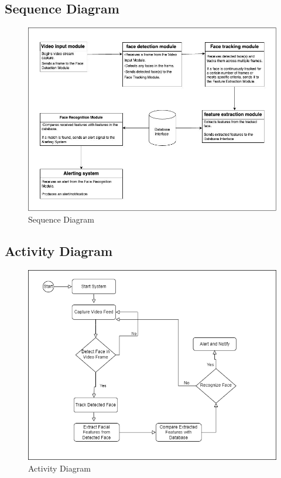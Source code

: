 	\pagebreak

	\subsection{Sequence Diagram}
		\begin{figure}[h!]
			\includegraphics[width=\textwidth]{components/images/sequence.jpg}
			\caption{Sequence Diagram}
			\label{fig:sequence}
		\end{figure}

	\pagebreak

	\subsection{Activity Diagram}
		\begin{figure}[h!]
			\includegraphics[width=\textwidth]{components/images/activity.png}
			\caption{Activity Diagram}
			\label{fig:activity}
		\end{figure}

